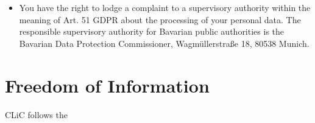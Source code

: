 \documentclass[letterpaper,10pt,english]{sphinxmanual}
\begin{document}
\begin{itemize}
\item {} 
\sphinxAtStartPar
You have the right to lodge a complaint to a supervisory authority within the meaning of Art. 51 GDPR about the processing of your personal data. The responsible supervisory authority for Bavarian public authorities is the Bavarian Data Protection Commissioner, Wagmüllerstraße 18, 80538 Munich.

\end{itemize}

\sphinxstepscope


\section{Freedom of Information}
\label{\detokenize{policies/freedomofinformation:freedom-of-information}}\label{\detokenize{policies/freedomofinformation::doc}}
\sphinxAtStartPar
CLiC follows the 

\sphinxstepscope
\end{document}
